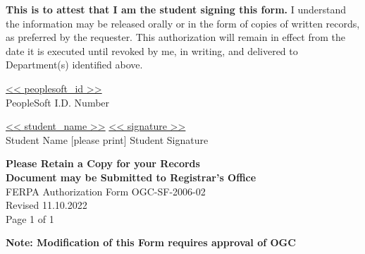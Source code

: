 \documentclass[12pt]{article}
\begin{document}
\vspace{0.3cm}
\textbf{This is to attest that I am the student signing this form.} I understand the information may be released orally or in the form of copies of written records, as preferred by the requester. This authorization will remain in effect from the date it is executed until revoked by me, in writing, and delivered to Department(s) identified above.

\vspace{0.6cm}
\underline{<< peoplesoft_id >>}\\
PeopleSoft I.D. Number

\vspace{0.3cm}
\underline{<< student_name >>} \hspace{0.5cm} \underline{<< signature >>}\\
Student Name [please print] \hspace{2cm} Student Signature

\vspace{0.6cm}
\textbf{Please Retain a Copy for your Records}\\
\textbf{Document may be Submitted to Registrar’s Office}\\
FERPA Authorization Form OGC-SF-2006-02\\
Revised 11.10.2022\\
Page 1 of 1

\vfill
\hfill \textbf{Note: Modification of this Form requires approval of OGC}
\end{document}
